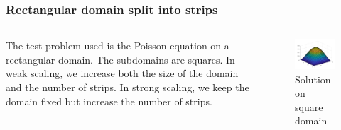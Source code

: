 \documentclass{beamer}
\begin{document}
\begin{frame}
\frametitle{Rectangular domain split into strips}

\begin{columns}
	\begin{column}{0.5\textwidth}
		The test problem used is the Poisson equation on a rectangular domain.
		The subdomains are squares.
		In weak scaling, we increase both the size of the domain and the number of strips.
		In strong scaling, we keep the domain fixed but increase the number of strips.
	\end{column}
	\begin{column}{0.5\textwidth}
		\begin{figure}
			\includegraphics[width=\textwidth]{FIG/MTLB_blocks.png}
			\caption{Solution on square domain}
		\end{figure}
	\end{column}
\end{columns}

\end{frame}
\end{document}
